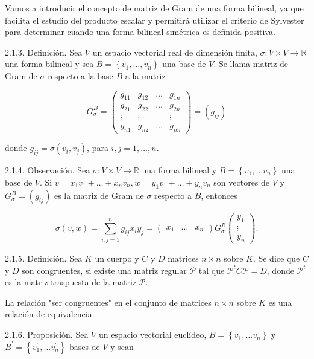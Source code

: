 \documentclass[12pt, a4paper, ones, notitlepage, openany,titlepage]{article}
\begin{document}
Vamos a introducir el concepto de matriz de Gram de una forma bilineal, ya que facilita el estudio del producto escalar y permitirá utilizar el criterio de Sylvester para determinar cuando una forma bilineal simétrica es definida positiva.

2.1.3. Definición. Sea $V$ un espacio vectorial real de dimensión finita, $\sigma: V \times V \rightarrow \mathbb{R}$ una forma bilineal y sea $B=\left\{v_{1}, \ldots, v_{n}\right\}$ una base de $V$. Se llama matriz de Gram de $\sigma$ respecto a la base $B$ a la matriz

$$
G_{\sigma}^{B}=\left(\begin{array}{cccc}
	g_{11} & g_{12} & \ldots & g_{1 n} \\
	g_{21} & g_{22} & \ldots & g_{2 n} \\
	\vdots & \vdots & & \vdots \\
	g_{n 1} & g_{n 2} & \ldots & g_{n n}
\end{array}\right)=\left(g_{i j}\right)
$$

donde $g_{i j}=\sigma\left(v_{i}, v_{j}\right)$, para $i, j=1, \ldots, n$.

2.1.4. Observación. Sea $\sigma: V \times V \rightarrow \mathbb{R}$ una forma bilineal y $B=\left\{v_{1}, \ldots v_{n}\right\}$ una base de $V$. Si $v=x_{1} v_{1}+\ldots+x_{n} v_{n}, w=y_{1} v_{1}+\ldots+y_{n} v_{n}$ son vectores de $V$ y $G_{\sigma}^{B}=\left(g_{i j}\right)$ es la matriz de Gram de $\sigma$ respecto a $B$, entonces

$$
\sigma(v, w)=\sum_{i, j=1}^{n} g_{i j} x_{i} y_{j}=\left(\begin{array}{lll}
	x_{1} & \ldots & x_{n}
\end{array}\right) G_{\sigma}^{B}\left(\begin{array}{c}
	y_{1} \\
	\vdots \\
	y_{n}
\end{array}\right) .
$$

2.1.5. Definición. Sea $K$ un cuerpo y $C$ y $D$ matrices $n \times n$ sobre $K$. Se dice que $C$ y $D$ son congruentes, si existe una matriz regular $\mathcal{P}$ tal que $\mathcal{P}^{t} C \mathcal{P}=D$, donde $\mathcal{P}^{t}$ es la matriz traspuesta de la matriz $\mathcal{P}$.

La relación "ser congruentes" en el conjunto de matrices $n \times n$ sobre $K$ es una relación de equivalencia.

2.1.6. Proposición. Sea $V$ un espacio vectorial euclídeo, $B=\left\{v_{1}, \ldots v_{n}\right\}$ y $B^{\prime}=\left\{v_{1}^{\prime}, \ldots v_{n}^{\prime}\right\}$ bases de $V$ y sean
\end{document}
